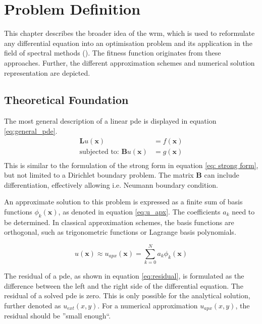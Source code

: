 \documentclass[./\jobname.tex]{subfiles}
\begin{document}
\section{Problem Definition}
This chapter describes the broader idea of the \gls{wrm}, which is used to reformulate any differential equation into an optimisation problem and its application in the field of spectral methods (\cite{shen_spectral_2011}). The fitness function originates from these approaches. Further, the different approximation schemes and numerical solution representation are depicted. 

\subsection{Theoretical Foundation}
\label{chap:opt_problem}

The most general description of a linear \gls{pde} is displayed in equation \eqref{eq:general_pde}.
\begin{equation}
\label{eq:general_pde}
\begin{split}
\mathbf{L}u(\mathbf{x}) & = f(\mathbf{x}) \\
\text{subjected to: }\mathbf{B}u(\mathbf{x}) & = g(\mathbf{x}) \\
\end{split}
\end{equation}
This is similar to the formulation of the strong form in equation \eqref{eq: strong form}, but not limited to a Dirichlet boundary problem. The matrix $\mathbf{B}$ can include differentiation, effectively allowing i.e. Neumann boundary condition. 

An approximate solution to this problem is expressed as a finite sum of basis functions $\phi_k(\mathbf{x})$, as denoted in equation \eqref{eq:u_apx}. The coefficients $a_k$ need to be determined. In classical approximation schemes, the basis functions are orthogonal, such as trigonometric functions or Lagrange basis polynomials. 

\begin{equation}
\label{eq:u_apx}
u(\mathbf{x}) \approx u_{apx}(\mathbf{x}) = \sum_{k=0}^{N} a_k \phi_k (\mathbf{x})
\end{equation}

The residual of a \gls{pde}, as shown in equation \eqref{eq:residual}, is formulated as the difference between the left and the right side of the differential equation. The residual of a solved \gls{pde} is zero. This is only possible for the analytical solution, further denoted as $u_{ext}(x,y)$. For a numerical approximation $u_{apx}(x,y)$, the residual should be ''small enough``. 
\end{document}
